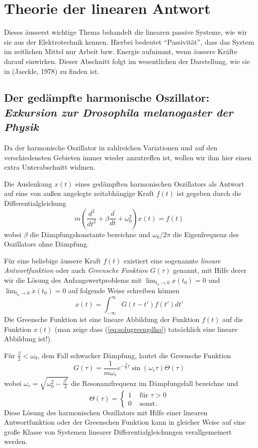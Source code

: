 \chapter{Theorie der linearen Antwort}
Dieses äusserst wichtige Thema behandelt die linearen passive Systeme, wie wir
sie aus der Elektrotechnik kennen. Hierbei bedeutet ``Passivität'', dass das
System im zeitlichen Mittel nur Arbeit bzw. Energie aufnimmt, wenn äussere
Kräfte darauf einwirken. Dieser Abschnitt folgt im wesentlichen der
Darstellung, wie sie in (Jaeckle, 1978) zu finden ist.
\section{Der gedämpfte harmonische Oszillator: 
\it Exkursion zur Drosophila melanogaster der Physik}\label{sec:gho}
Da der harmonische Oszillator in zahlreichen Variationen und auf den
verschiedensten Gebieten immer wieder anzutreffen ist, wollen wir ihm hier
einen extra Unterabschnitt widmen. 

Die Auslenkung $x(t)$ eines gedämpften harmonischen Oszillators als Antwort
auf eine von außen angelegte zeitabhängige Kraft $f(t)$ ist gegeben durch
die Differentialgleichung
\begin{equation}
  m\left(\frac{d^2}{dt^2}+\beta\frac{d}{dt}+\omega_0^2\right)x(t)=f(t)  
  \label{eq:gdho}
\end{equation}
wobei $\beta$ die Dämpfungskonstante bezeichne und $\omega_0/2\pi$ die
Eigenfrequenz des Oszillators ohne Dämpfung.

Für eine beliebige äussere Kraft $f(t)$ existiert eine sogenannte {\it
lineare Antwortfunktion} oder auch {\it Greensche Funktion} $G(\tau)$ genannt,
mit Hilfe derer wir die Lösung des Anfangswertproblems mit
$\lim_{t_0\rightarrow 0}x(t_0)=0$ und $\lim_{t_0\rightarrow 0}\dot{x}(t_0)=0$
auf folgende Weise schreiben können
\begin{equation}
  x(t)=\int_{-\infty}^{\infty}G(t-t')f(t')dt'
  \label{eq:solugreengdho}
\end{equation}
Die Greensche Funktion ist eine lineare Abbildung der Funktion $f(t)$ auf die
Funktion $x(t)$ (man zeige dass (\ref{eq:solugreengdho}) tatsächlich eine
lineare Abbildung ist!).

Für $\frac{\beta}{2}<\omega_0$, dem Fall schwacher Dämpfung, lautet die
Greensche Funktion 
\begin{equation}
  G(\tau)=\frac{1}{m\omega_r}e^{-\frac{\beta}{2}\tau}\sin(\omega_r\tau)\Theta(\tau)
  \label{eq:Greenfunction}
\end{equation}
wobei $\omega_r=\sqrt{\omega_0^2-\frac{\beta^2}{4}}$ die Resonanzfrequenz im
Dämpfungsfall bezeichne und 
\begin{equation*}
  \Theta(\tau)=\left\{\begin{array}{cc}1&\mbox{ für }\tau>0\\0&\mbox{ sonst. }\end{array}\right.
\end{equation*}
Diese Lösung des harmonischen Oszillators mit Hilfe einer linearen
Antwortfunktion oder der Greenschen Funktion kann in gleicher Weise auf eine
gro{\ss}e Klasse von Systemen linearer Differentialgleichungen verallgemeinert
werden.

